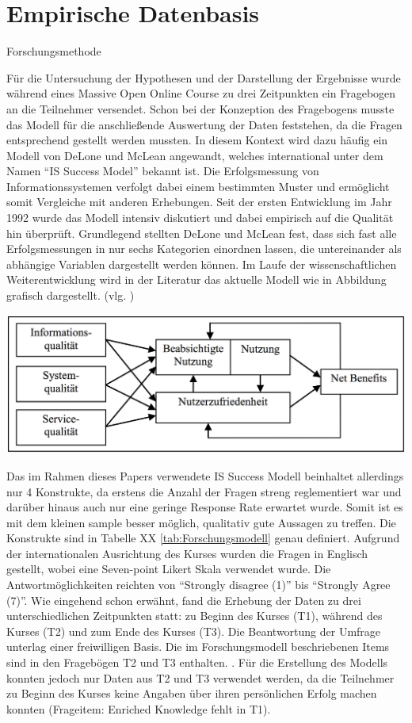 \section{Empirische Datenbasis}
\label{sec:emp_daten}

Forschungsmethode

Für die Untersuchung der Hypothesen und der Darstellung der Ergebnisse wurde während eines Massive Open Online Course zu drei Zeitpunkten ein Fragebogen an die Teilnehmer versendet. Schon bei der Konzeption des Fragebogens musste das Modell für die anschließende Auswertung der Daten feststehen, da die Fragen entsprechend gestellt werden mussten. In diesem Kontext wird dazu häufig ein Modell von DeLone und McLean angewandt, welches international unter dem Namen "`IS Success Model"' bekannt ist. Die Erfolgsmessung von Informationssystemen verfolgt dabei einem bestimmten Muster und ermöglicht somit Vergleiche mit anderen Erhebungen. Seit der ersten Entwicklung im Jahr 1992 wurde das Modell intensiv diskutiert und dabei empirisch auf die Qualität hin überprüft. Grundlegend stellten DeLone und McLean fest, dass sich fast alle Erfolgsmessungen in nur sechs Kategorien einordnen lassen, die untereinander als abhängige Variablen dargestellt werden können. Im Laufe der wissenschaftlichen Weiterentwicklung wird in der Literatur das aktuelle Modell wie in Abbildung grafisch dargestellt. (vlg. \cite{delone2002information})

\includegraphics[width=1\textwidth]{Grafiken/issuccess.png}
\label{tab:Forschungsmodell} 

Das im Rahmen dieses Papers verwendete IS Success Modell beinhaltet allerdings nur 4 Konstrukte, da erstens die Anzahl der Fragen streng reglementiert war und darüber hinaus auch nur eine geringe Response Rate erwartet wurde. Somit ist es mit dem kleinen sample besser möglich, qualitativ gute Aussagen zu treffen. Die Konstrukte sind in Tabelle XX \ref{tab:Forschungsmodell} genau definiert. Aufgrund der internationalen Ausrichtung des Kurses wurden die Fragen in Englisch gestellt, wobei eine Seven-point Likert Skala verwendet wurde. Die Antwortmöglichkeiten reichten von "`Strongly disagree (1)"' bis "`Strongly Agree (7)"'. Wie eingehend schon erwähnt, fand die Erhebung der Daten zu drei unterschiedlichen Zeitpunkten statt: zu Beginn des Kurses (T1), während des Kurses (T2) und zum Ende des Kurses (T3). Die Beantwortung der Umfrage unterlag einer freiwilligen Basis. Die im Forschungsmodell beschriebenen Items sind in den Fragebögen T2 und T3 enthalten. .
Für die Erstellung des Modells konnten jedoch nur Daten aus T2 und T3 verwendet werden, da die Teilnehmer zu Beginn des Kurses keine Angaben über ihren persönlichen Erfolg machen konnten (Frageitem: Enriched Knowledge fehlt in T1). 
 
